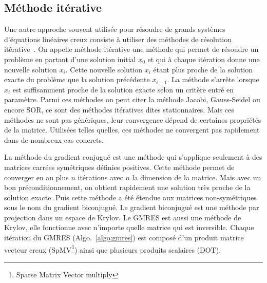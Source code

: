 \subsection{Méthode itérative}
Une autre approche souvent utilisée pour résoudre de grands systèmes d'équations linéaires creux consiste à utiliser des méthodes de résolution itérative~\cite{Saad96IMSLS}.
%
On appelle méthode itérative une méthode qui permet de résoudre un problème en partant d'une solution initial $x_0$ et qui à chaque itération donne une nouvelle solution $x_i$.
%
Cette nouvelle solution $x_i$ étant plus proche de la solution exacte du problème que la solution précédente $x_{i-1}$.
%
La méthode s'arrête lorsque $x_i$ est suffisamment proche de la solution exacte selon un critère entré en paramètre.
%
Parmi ces méthodes on peut citer la méthode Jacobi, Gauss-Seidel ou encore SOR, ce sont des méthodes itératives dites stationnaires.
%
Mais ces méthodes ne sont pas génériques, leur convergence dépend de certaines propriétés de la matrice.
%
Utilisées telles quelles, ces méthodes ne convergent pas rapidement dans de nombreux cas concrets.


La méthode du gradient conjugué est une méthode qui s'applique seulement à des matrices carrées symétriques définies positives.
%
Cette méthode permet de converger en au plus $n$ itérations avec $n$ la dimension de la matrice.
%
Mais avec un bon préconditionnement, on obtient rapidement une solution très proche de la solution exacte.
%
Puis cette méthode a été étendue aux matrices non-symétriques sous le nom du gradient biconjugué.
%
Le gradient biconjugué est une méthode par projection dans un espace de Krylov.
%
Le GMRES est aussi une méthode de Krylov, elle fonctionne avec n'importe quelle matrice qui est inversible.
%
Chaque itération du GMRES (Algo.~\ref{algo:gmres}) est composé d'un produit matrice vecteur creux (SpMV\footnote{Sparse Matrix Vector multiply}) ainsi que plusieurs produits scalaires (DOT).

